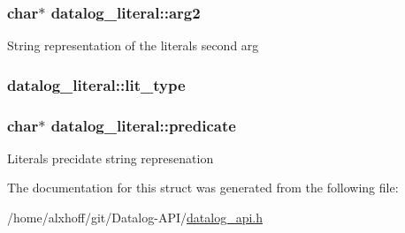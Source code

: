 \subsubsection[{\texorpdfstring{arg2}{arg2}}]{\setlength{\rightskip}{0pt plus 5cm}char$\ast$ datalog\+\_\+literal\+::arg2}\hypertarget{structdatalog__literal_a38e9dc36488ad4014bfb52027cc65cc9}{}\label{structdatalog__literal_a38e9dc36488ad4014bfb52027cc65cc9}
String representation of the literals second arg 
\subsubsection[{\texorpdfstring{lit\+\_\+type}{lit_type}}]{ datalog\+\_\+literal\+::lit\+\_\+type}\hypertarget{structdatalog__literal_a7fad52c17a15a69937de4e78746be12c}{}\label{structdatalog__literal_a7fad52c17a15a69937de4e78746be12c}
\subsubsection[{\texorpdfstring{predicate}{predicate}}]{\setlength{\rightskip}{0pt plus 5cm}char$\ast$ datalog\+\_\+literal\+::predicate}\hypertarget{structdatalog__literal_aad44475a0e606d9fd9c5e7aae3667412}{}\label{structdatalog__literal_aad44475a0e606d9fd9c5e7aae3667412}
Literal\textquotesingle{}s precidate string represenation 

The documentation for this struct was generated from the following file\+:\begin{DoxyCompactItemize}
\item 
/home/alxhoff/git/\+Datalog-\/\+A\+P\+I/\hyperlink{datalog__api_8h}{datalog\+\_\+api.\+h}\end{DoxyCompactItemize}
